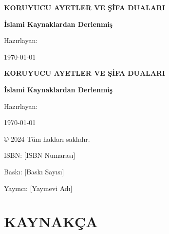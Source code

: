 \documentclass[a4paper,12pt]{book}
\makeatletter
\renewcommand{\cleardoublepage}{\clearpage\if@twoside \ifodd\c@page\else
    \hbox{}\thispagestyle{empty}\newpage\if@twocolumn\hbox{}\newpage\fi\fi\fi}
\makeatother
\begin{document}
\begin{titlepage}
\begin{center}
\vspace*{2cm}
{\Huge\bfseries KORUYUCU AYETLER VE ŞİFA DUALARI\par}
\vspace{1cm}
{\Large\bfseries İslami Kaynaklardan Derlenmiş\par}
\vspace{2cm}

{\large Hazırlayan:\\[Yazar Adı]\par}
\vspace{1cm}
{\large \today\par}
\end{center}
\end{titlepage}

\begin{titlepage}
\begin{center}
\vspace*{2cm}
{\Huge\bfseries KORUYUCU AYETLER VE ŞİFA DUALARI\par}
\vspace{1cm}
{\Large\bfseries İslami Kaynaklardan Derlenmiş\par}
\vspace{2cm}

{\large Hazırlayan:\\[Yazar Adı]\par}
\vspace{1cm}
{\large \today\par}
\end{center}
\end{titlepage}

\begin{titlepage}
\begin{center}
\vspace*{2cm}
{\large © 2024 Tüm hakları saklıdır.\par}
\vspace{1cm}
{\large ISBN: [ISBN Numarası]\par}
\vspace{1cm}
{\large Baskı: [Baskı Sayısı]\par}
\vspace{1cm}
{\large Yayıncı: [Yayınevi Adı]\par}
\end{center}
\end{titlepage}

\tableofcontents
\cleardoublepage



\chapter{KAYNAKÇA}

\end{document}
